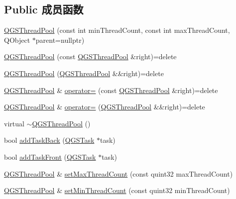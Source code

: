 \subsection*{Public 成员函数}
\begin{DoxyCompactItemize}
\item 
\mbox{\hyperlink{class_q_g_s_thread_pool_aee3b59cc02b7cab4c28e1dda0cd30199}{Q\+G\+S\+Thread\+Pool}} (const int min\+Thread\+Count, const int max\+Thread\+Count, Q\+Object $\ast$parent=nullptr)
\item 
\mbox{\hyperlink{class_q_g_s_thread_pool_a80b24826f940decd2e16b111288a11b9}{Q\+G\+S\+Thread\+Pool}} (const \mbox{\hyperlink{class_q_g_s_thread_pool}{Q\+G\+S\+Thread\+Pool}} \&right)=delete
\item 
\mbox{\hyperlink{class_q_g_s_thread_pool_a5fc9ad5ad1dce6d4b15a1b90b957dee2}{Q\+G\+S\+Thread\+Pool}} (\mbox{\hyperlink{class_q_g_s_thread_pool}{Q\+G\+S\+Thread\+Pool}} \&\&right)=delete
\item 
\mbox{\hyperlink{class_q_g_s_thread_pool}{Q\+G\+S\+Thread\+Pool}} \& \mbox{\hyperlink{class_q_g_s_thread_pool_ae4da273a54d581bf1431ca85242c1f79}{operator=}} (const \mbox{\hyperlink{class_q_g_s_thread_pool}{Q\+G\+S\+Thread\+Pool}} \&right)=delete
\item 
\mbox{\hyperlink{class_q_g_s_thread_pool}{Q\+G\+S\+Thread\+Pool}} \& \mbox{\hyperlink{class_q_g_s_thread_pool_acbfc4c10c4b39b1e6c2778fb5796e888}{operator=}} (\mbox{\hyperlink{class_q_g_s_thread_pool}{Q\+G\+S\+Thread\+Pool}} \&\&right)=delete
\item 
virtual \mbox{\hyperlink{class_q_g_s_thread_pool_ac136d0d8bd2e58e432a0fee3295fd165}{$\sim$\+Q\+G\+S\+Thread\+Pool}} ()
\item 
bool \mbox{\hyperlink{class_q_g_s_thread_pool_a3d458e75a247c13b0a97766b9997a9a9}{add\+Task\+Back}} (\mbox{\hyperlink{class_q_g_s_task}{Q\+G\+S\+Task}} $\ast$task)
\item 
bool \mbox{\hyperlink{class_q_g_s_thread_pool_a4b710eb0d9ac66a22122e19af3f7a228}{add\+Task\+Front}} (\mbox{\hyperlink{class_q_g_s_task}{Q\+G\+S\+Task}} $\ast$task)
\item 
\mbox{\hyperlink{class_q_g_s_thread_pool}{Q\+G\+S\+Thread\+Pool}} \& \mbox{\hyperlink{class_q_g_s_thread_pool_ac2e81d9d8b1244e22f87e4df5df87937}{set\+Max\+Thread\+Count}} (const quint32 max\+Thread\+Count)
\item 
\mbox{\hyperlink{class_q_g_s_thread_pool}{Q\+G\+S\+Thread\+Pool}} \& \mbox{\hyperlink{class_q_g_s_thread_pool_a31d39ea357d36ff6d1976d4fcf153fcf}{set\+Min\+Thread\+Count}} (const quint32 min\+Thread\+Count)

\end{DoxyCompactItemize}
